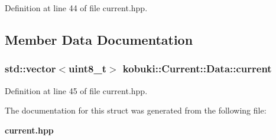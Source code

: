 \-Definition at line 44 of file current.\-hpp.



\subsection{\-Member \-Data \-Documentation}
\subsubsection[{current}]{\setlength{\rightskip}{0pt plus 5cm}std\-::vector$<$uint8\-\_\-t$>$ {\bf kobuki\-::\-Current\-::\-Data\-::current}}\label{structkobuki_1_1Current_1_1Data_ab7ee84124d14a12f12698dc7b83765ab}


\-Definition at line 45 of file current.\-hpp.



\-The documentation for this struct was generated from the following file\-:\begin{DoxyCompactItemize}
\item 
{\bf current.\-hpp}\end{DoxyCompactItemize}
